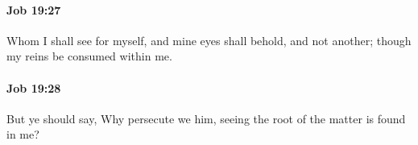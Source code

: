 		\paragraph{Job 19:27} %
			\label{JOB-19-27}

			Whom I shall see for myself, and mine eyes shall behold, and not another; though my reins be consumed within me.


		\paragraph{Job 19:28} %
			\label{JOB-19-28}

			But ye should say, Why persecute we him, seeing the root of the matter is found in me?


